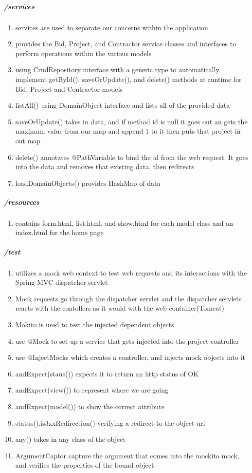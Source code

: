 \documentclass[a4paper,12pt]{article}
\begin{document}
\subparagraph{/services}
\begin{enumerate}[label=(\alph*)]
\item services are used to separate our concerns within the application
\item provides the Bid, Project, and Contractor service classes and interfaces to perform operations within the various models
\item using CrudRepository interface with a generic type to automatically implement getById(), saveOrUpdate(), and delete() methods at runtime for Bid, Project and Contractor models
\item listAll() using DomainObject interface and lists all of the provided data
\item saveOrUpdate()  takes in data, and if method id is null it goes out an gets the maximum value from our map and append 1 to it then puts that project in out map
\item delete() annotates @PathVariable to bind the id from the web request. It goes into the data and removes that existing data, then redirects
\item loadDomainObjects() provides HashMap of data
\end{enumerate} 

\subparagraph{/resources}
\begin{enumerate}[label=(\alph*)]
\item contains form.html, list.html, and show.html for each model class and an index.html for the home page
\end{enumerate} 

\subparagraph{/test}
\begin{enumerate}[label=(\alph*)]
\item utilizes a mock web context to test web requests and its interactions with the Spring MVC dispatcher servlet
\item Mock requests go through the dispatcher servlet and the dispatcher servlets reacts with the contollers as it would with the web container(Tomcat)
\item Mokito is used to test the injected dependent objects
\item use @Mock to set up a service that gets injected into the project controller
\item use @InjectMocks which creates a controller, and injects mock objects into it
\item andExpect(staus()) expects it to return an http status of OK
\item andExpect(view()) to represent where we are going
\item andExpect(model()) to show the correct attribute 
\item status().is3xxRedirection() verifying a redirect to the object url
\item any() takes in any class of the object
\item ArgumentCaptor capture the argument that comes into the mockito mock, and verifies the properties of the bound object

\end{enumerate}
\end{document}
